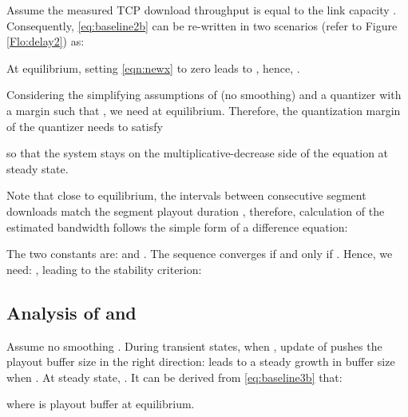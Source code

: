 \documentclass[conference]{IEEEtran}
\theoremstyle{plain}
\theoremstyle{definition}
\theoremstyle{plain}
\theoremstyle{plain}
\begin{document}
Assume the measured TCP download throughput  is equal
to the link capacity . Consequently, \eqref{eq:baseline2b} can
be re-written in two scenarios (refer to Figure \ref{Flo:delay2})
as:



At equilibrium, setting \eqref{eqn:newx} to zero leads to ,
hence, .

Considering the simplifying assumptions of  (no
smoothing) and a quantizer with a margin  such that ,
we need  at equilibrium.
Therefore, the quantization margin of the quantizer needs to satisfy

so that the system stays on the multiplicative-decrease side of the
equation at steady state.

Note that close to equilibrium, the intervals between consecutive
segment downloads match the segment playout duration ,
therefore, calculation of the estimated bandwidth  follows
the simple form of a difference equation:

The two constants are:  and .
The sequence converges if and only if . Hence, we need: ,
leading to the stability criterion: 




\subsection{Analysis of  and }

Assume no smoothing . During transient states, when
, update of  pushes the playout buffer
size in the right direction: 
leads to a steady growth in buffer size when . At steady
state, . It can be derived
from \eqref{eq:baseline3b} that: 

where  is playout buffer at equilibrium.
\end{document}
